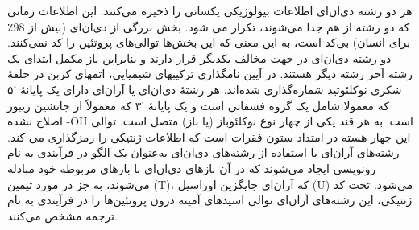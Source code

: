 \documentclass[12pt,a4paper,BCOR=.7cm,headsepline,bibliography=totoc]{report}
\begin{document}
هر دو رشته دی‌ان‌ای اطلاعات بیولوژیکی یکسانی را ذخیره می‌کنند. این اطلاعات زمانی که دو رشته از هم جدا می‌شوند، تکرار می شود. بخش بزرگی از دی‌ان‌ای (بیش از 98٪ برای انسان) بی‌کد
 است، به این معنی که این بخش‌ها توالی‌های پروتئین را کد نمی‌کنند. دو رشته دی‌ان‌ای در جهت مخالف یکدیگر قرار دارند و بنابراین باز مکمل ابتدای یک رشته آخر رشته دیگر هستند. در آیین نامگذاری ترکیبهای شیمیایی، اتمهای کربن در حلقهٔ شکری نوکلئوتید شماره‌گذاری شده‌اند. هر رشتهٔ دی‌ان‌ای یا آران‌ای دارای یک پایانهٔ '۵ که معمولا شامل یک گروه فسفاتی است و یک پایانهٔ '۳ که معمولاً از جانشین ریبوز اصلاح نشده -OH است. به هر قند یکی از چهار نوع نوکلئوباز (یا باز) متصل است. توالی این چهار هسته در امتداد ستون فقرات است که اطلاعات ژنتیکی را رمزگذاری می کند. رشته‌های آر‌ان‌ای با استفاده از رشته‌های دی‌ان‌ای به‌عنوان یک الگو در فرآیندی به نام رونویسی ایجاد می‌شوند که در آن بازهای دی‌ان‌ای با بازهای مربوطه خود مبادله می‌شوند، به جز در مورد تیمین (T)، که آر‌ان‌ای جایگزین اوراسیل (U) می‌شود. تحت کد ژنتیکی، این رشته‌های آر‌ان‌ای توالی اسیدهای آمینه درون پروتئین‌ها را در فرآیندی به نام ترجمه مشخص می‌کنند.
\end{document}

